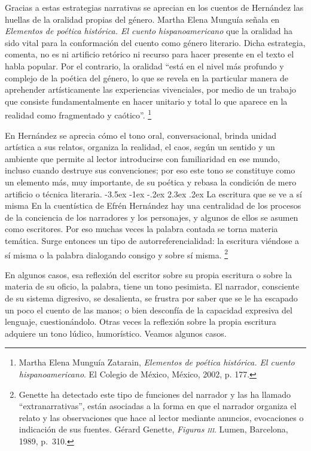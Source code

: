 \documentclass[14pt,twoside,final]{extbook} %
\makeatletter
\let\oldfootnote\footnote
\renewcommand\footnote[1]{%
\oldfootnote{\hspace{1mm}#1}}
\renewcommand\section{\@startsection {section}{1}{\z@}%
                                     {-3.5ex \@plus -1ex \@minus -.2ex}%
                                     {2.3ex \@plus .2ex}%
                                     {\normalfont\large\bfseries\sc}}
\makeatother
\begin{document}
Gracias a estas estrategias narrativas se aprecian en los cuentos de Hernández las huellas de la oralidad propias del género. Martha Elena Munguía señala en \emph{Elementos de poética histórica. El cuento hispanoamericano} que la oralidad ha sido vital para la conformación del cuento como género literario. Dicha estrategia, comenta, no es ni artificio retórico ni recurso para hacer presente en el texto el habla popular. Por el contrario, la oralidad ``está en el nivel más profundo y complejo de la poética del género, lo que se revela en la particular manera de aprehender artísticamente las experiencias vivenciales, por medio de un trabajo que consiste fundamentalmente en hacer unitario y total lo que aparece en la realidad como fragmentado y caótico''.\footnote{Martha Elena Munguía Zatarain, \emph{Elementos de poética histórica. El cuento hispanoamericano}. El Colegio de México, México, 2002, p. 177.}

En Hernández se aprecia cómo el tono oral, conversacional, brinda unidad artística a sus relatos, organiza la realidad, el caos, según un sentido y un ambiente que permite al lector introducirse con familiaridad en ese mundo, incluso cuando destruye sus convenciones; por eso este tono se constituye como un elemento más, muy importante, de su poética y rebasa la condición de mero artificio o técnica literaria.
\section{La escritura que se ve a sí misma}\label{sec:la-escritura-que-se-ve-a-si-misma}
En la cuentística de Efrén Hernández hay una centralidad de los procesos de la conciencia de los narradores y los personajes, y algunos de ellos se asumen como escritores. Por eso muchas veces la palabra contada se torna materia temática. Surge entonces un tipo de autorreferencialidad: la escritura viéndose a sí misma o la palabra dialogando consigo y sobre sí misma.\footnote{Genette ha detectado este tipo de funciones del narrador y las ha llamado ``extranarrativas'', están asociadas a la forma en que el narrador organiza el relato y las observaciones que hace al lector mediante anuncios, evocaciones o indicación de sus fuentes. Gérard Genette, \emph{Figuras \textsc{iii}}. Lumen, Barcelona, 1989, p.~310.}

En algunos casos, esa reflexión del escritor sobre su propia escritura o sobre la materia de su oficio, la palabra, tiene un tono pesimista. El narrador, consciente de su sistema digresivo, se desalienta, se frustra por saber que se le ha escapado un poco el cuento de las manos; o bien desconfía de la capacidad expresiva del lenguaje, cuestionándolo. Otras veces la reflexión sobre la propia escritura adquiere un tono lúdico, humorístico. Veamos algunos casos.
\end{document}
